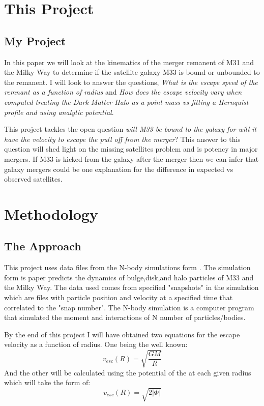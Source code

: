 \documentclass[fleqn,usenatbib]{mnras}
\begin{document}
\section{This Project}

\subsection{My Project}
\label{sec:My Project}
In this paper we will look at the kinematics of the merger remanent of M31 and the Milky Way to determine if the satellite galaxy M33 is bound or unbounded to the remanent. I will look to answer the questions, \textit{What is the escape speed of the remnant as a function of radius} and \textit{How does the escape velocity vary when computed treating the Dark Matter Halo as a point mass vs fitting a Hernquist profile and using analytic potential}.

This project tackles the open question \textit{will M33 be bound to the galaxy for will it have the velocity to escape the pull off from the merger}? This answer to this question will shed light on the missing satellites problem and is potency in major mergers. If M33 is kicked from the galaxy after the merger then we can infer that galaxy mergers could be one explanation for the difference in expected vs observed satellites. 


\section{Methodology}
\label{sec:Mothodology}
\subsection{The Approach}
This project uses data files from the N-body simulations form \cite{vanderMarel2012ApJ}. The simulation form is paper predicts the dynamics of bulge,disk,and halo particles of M33 and the Milky Way. The data used comes from specified "snapshots" in the simulation which are files with particle position and velocity at a specified time that correlated to the "snap number". The N-body simulation is a computer program that simulated the moment and interactions of N number of particles/bodies. 

By the end of this project I will have obtained two equations for the escape velocity as a function of radius. One being the well known:
\begin{equation}
    v_{esc}(R) = \sqrt{\frac{GM}{R}} \label{EQ1}
\end{equation}
And the other will be calculated using the potential of the at each given radius which will take the form of:
\begin{equation}
    v_{esc}(R) = \sqrt{2|\Phi|} \label{EQ2}
\end{equation}
\end{document}
